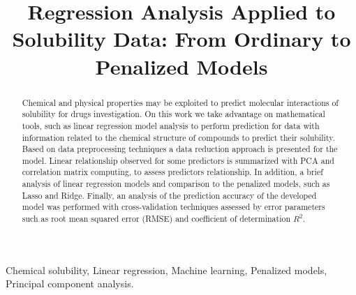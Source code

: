\documentclass[conference]{IEEEtran}
\begin{document}
\title{Regression Analysis Applied to Solubility Data: From Ordinary to Penalized Models}

\author{
\and
{}
}

\maketitle

\begin{abstract}
Chemical and physical properties may be exploited to predict molecular interactions of solubility for drugs investigation. On this work we take advantage on mathematical tools, such as linear regression model analysis to perform prediction for data with information related to the chemical structure of compounds to predict their solubility. Based on data preprocessing techniques a data reduction approach is presented for the model. Linear relationship observed for some predictors is summarized with PCA and correlation matrix computing, to assess predictors relationship. In addition, a brief analysis of linear regression models and comparison to the penalized models, such as Lasso and Ridge. Finally, an analysis of the prediction accuracy of the developed model was performed with cross-validation techniques assessed by error parameters such as root mean squared error (RMSE) and coefficient of determination $R^{2}$.

\end{abstract}

\begin{IEEEkeywords}
Chemical solubility, Linear regression, Machine learning, Penalized models, Principal component analysis.

\end{IEEEkeywords}












\end{document}
